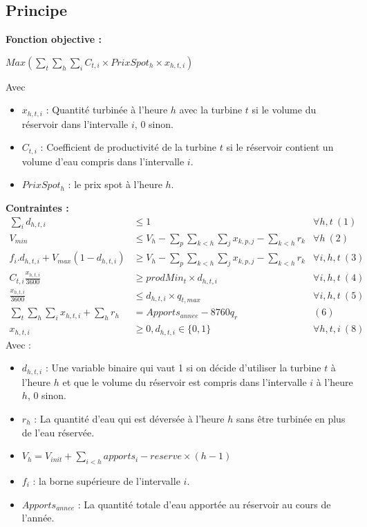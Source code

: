 \documentclass[a4paper]{report}
\begin{document}
\subsection{Principe}
\textbf{Fonction objective :}
\begin{center}
 $Max(\sum_t\sum_h\sum_i C_{t,i}\times PrixSpot_h \times x_{h,t,i})$
\end{center}
Avec\\
\begin{itemize}
\item $x_{h,t,i}$ : Quantité turbinée à l'heure $h$ avec la turbine $t$ si le volume du réservoir dans l'intervalle $i$, 0 sinon.
\item $C_{t,i}$ : Coefficient de productivité de la turbine $t$ si le réservoir contient un volume d'eau compris dans l'intervalle $i$. 
\item $PrixSpot_h$ : le prix spot à l'heure $h$.
 \end{itemize}
\textbf{Contraintes :}
\[\begin{aligned}
 \sum_i d_{h,t,i}&\leq1  &\forall h,t\ (1)\\
 V_{min}&\leq V_{h} -\sum_{p}\sum_{k<h}\sum_j x_{k,p,j} - \sum_{k<h} r_{k}& \forall h \ (2)\\
f_i. d_{h,t,i} + V_{max}(1-d_{h,t,i})&\geq V_{h} - \sum_{p}\sum_{k<h}\sum_j x_{k,p,j} - \sum_{k<h} r_{k}&\forall i,h,t\ (3)\\
C_{t,i} \frac{x_{h,t,i}}{3600}&\geq prodMin_t \times d_{h,t,i} & \forall i,h,t\ (4)\\
\frac{x_{h,t,i}}{3600} &\leq d_{h,t,i}\times q_{t,max} &\forall i,h,t\ (5)\\
\sum_{t}\sum_{h}\sum_{i} x_{h,t,i} +  \sum_{h} r_{h} &= Apports_{annee}- 8760 q_r  &(6)\\
x_{h,t,i}  &\geq 0 , d_{h,t,i}  \in \{0,1\}  & \forall h,t,i\ (8)
\end{aligned}\]
Avec :\\
\begin{itemize}
\item $d_{h,t,i}$ : Une variable binaire qui vaut 1 si on décide d'utiliser la turbine $t$ à l'heure $h$ et que le volume du réservoir est compris dans l'intervalle $i$ à l'heure $h$, 0 sinon.
\item $r_h$ : La quantité d'eau qui est déversée à l'heure $h$ sans être turbinée en plus de l'eau réservée.
\item $V_{h}= V_{init}+\sum_{i< h} apports_i - reserve\times (h-1)$
\item $f_i$ : la borne supérieure de l'intervalle $i$.
\item $Apports_{annee}$ : La quantité totale d'eau apportée au réservoir au cours de l'année.



\end{itemize}
\end{document}
